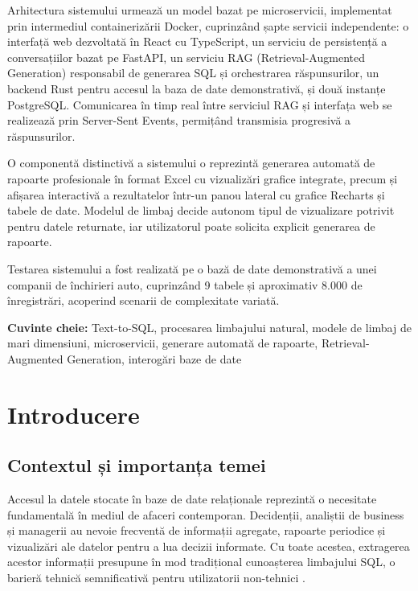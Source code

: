 \documentclass[12pt, a4paper]{report}
\begin{document}
Arhitectura sistemului urmează un model bazat pe microservicii, implementat prin intermediul containerizării Docker, cuprinzând șapte servicii independente: o interfață web dezvoltată în React cu TypeScript, un serviciu de persistență a conversațiilor bazat pe FastAPI, un serviciu RAG (Retrieval-Augmented Generation) responsabil de generarea SQL și orchestrarea răspunsurilor, un backend Rust pentru accesul la baza de date demonstrativă, și două instanțe PostgreSQL. Comunicarea în timp real între serviciul RAG și interfața web se realizează prin Server-Sent Events, permițând transmisia progresivă a răspunsurilor.

O componentă distinctivă a sistemului o reprezintă generarea automată de rapoarte profesionale în format Excel cu vizualizări grafice integrate, precum și afișarea interactivă a rezultatelor într-un panou lateral cu grafice Recharts și tabele de date. Modelul de limbaj decide autonom tipul de vizualizare potrivit pentru datele returnate, iar utilizatorul poate solicita explicit generarea de rapoarte.

Testarea sistemului a fost realizată pe o bază de date demonstrativă a unei companii de închirieri auto, cuprinzând 9 tabele și aproximativ 8.000 de înregistrări, acoperind scenarii de complexitate variată.

\vspace{0.5cm}
\noindent\textbf{Cuvinte cheie:} Text-to-SQL, procesarea limbajului natural, modele de limbaj de mari dimensiuni, microservicii, generare automată de rapoarte, Retrieval-Augmented Generation, interogări baze de date


\chapter{Introducere}

\section{Contextul și importanța temei}

Accesul la datele stocate în baze de date relaționale reprezintă o necesitate fundamentală în mediul de afaceri contemporan. Decidenții, analiștii de business și managerii au nevoie frecventă de informații agregate, rapoarte periodice și vizualizări ale datelor pentru a lua decizii informate. Cu toate acestea, extragerea acestor informații presupune în mod tradițional cunoașterea limbajului SQL, o barieră tehnică semnificativă pentru utilizatorii non-tehnici \cite{spider}.
\end{document}
